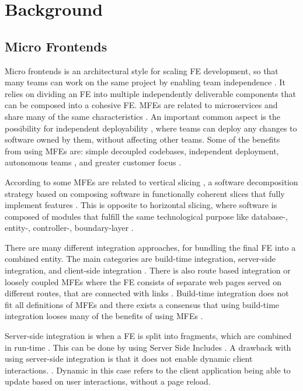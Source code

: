 \chapter{Background}

\section{Micro Frontends}
Micro frontends is an architectural style for scaling \ac{FE} development, so that many teams can work on the same project by enabling team independence \cite{Jackson2019}. It relies on dividing an \ac{FE} into multiple independently deliverable components that can be composed into a cohesive \ac{FE}. \acp{MFE} are related to microservices and share many of the same characteristics \cite[ch.~1]{Gears2020}. An important common aspect is the possibility for independent deployability \cite{Jackson2019}, where teams can deploy any changes to software owned by them, without affecting other teams. Some of the benefits from using \acp{MFE} are: simple decoupled codebases, independent deployment, autonomous teams \cite{Jackson2019}, and greater customer focus \cite[ch.~1]{Gears2020}.

According to some \acp{MFE} are related to vertical slicing \cite[ch.~1]{Gears2020}, a software decomposition strategy based on composing software in functionally coherent slices that fully implement features \cite{Ratner2011}. This is opposite to horizontal slicing, where software is composed of modules that fulfill the same technological purpose like database-, entity-, controller-, boundary-layer \cite{Ratner2011}.

There are many different integration approaches, for bundling the final \ac{FE} into a combined entity. The main categories are build-time integration, server-side integration, and client-side integration \cite{Jackson2019, Gears2020}. There is also route based integration or loosely coupled \acp{MFE} where the \ac{FE} consists of separate web pages served on different routes, that are connected with links \cites[ch.~2]{Gears2020}{ Yang2019}\cite{Yang2019}. Build-time integration does not fit all definitions of \acp{MFE} \cite{Gears2020} and there exists a consensus that using build-time integration looses many of the benefits of using \acp{MFE} \cite{Jackson2019}.

Server-side integration is when a \ac{FE} is split into fragments, which are combined in run-time \cite{Jackson2019, Gears2020}. This can be done by using Server Side Includes \cite{Gears2020,Jackson2019,Fagan}. A drawback with using server-side integration is that it does not enable dynamic client interactions. \cite[ch.~4]{Gears2020}. Dynamic in this case refers to the client application being able to update based on user interactions, without a page reload.

